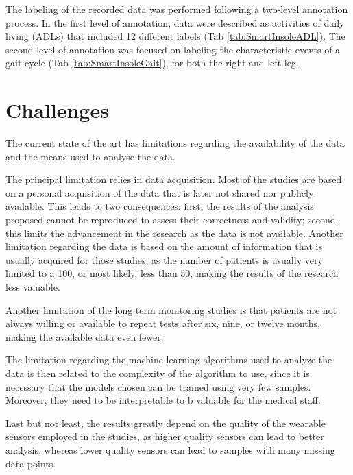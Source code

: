 The labeling of the recorded data was performed following a two-level annotation process. In the first level of annotation, data were described as activities of daily living (ADLs) that included 12 different labels (Tab \ref{tab:SmartInsoleADL}). The second level of annotation was focused on labeling the characteristic events of a gait cycle (Tab \ref{tab:SmartInsoleGait}), for both the right and left leg.




\section{Challenges}
The current state of the art has limitations regarding the availability of the data and the means used to analyse the data.

The principal limitation relies in data acquisition. Most of the studies are based on a personal acquisition of the data that is later not shared nor publicly available. This leads to two consequences: first, the results of the analysis proposed cannot be reproduced to assess their correctness and validity; second, this limits the advancement in the research as the data is not available.
Another limitation regarding the data is based on the amount of information that is usually acquired for those studies, as the number of patients is usually very limited to a 100, or most likely, less than 50, making the results of the research less valuable.

Another limitation of the long term monitoring studies is that patients are not always willing or available to repeat tests after six, nine, or twelve months, making the available data even fewer. 

The limitation regarding the machine learning algorithms used to analyze the data is then related to the complexity of the algorithm to use, since it is necessary that the models chosen can be trained using very few samples. Moreover, they need to be interpretable to b valuable for the medical staff.

Last but not least, the results greatly depend on the quality of the wearable sensors employed in the studies, as higher quality sensors can lead to better analysis, whereas lower quality sensors can lead to samples with many missing data points.

